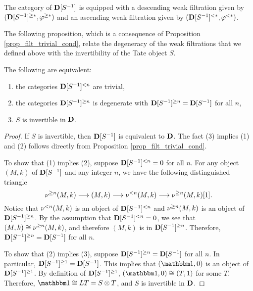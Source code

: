 \begin{thm}\label{thm_summary_dloc}
The category of $\DCatLoc{S}$ is equipped with a descending 
weak filtration given by $(\Prerad{*}{\DCatLoc{S}}, \prerad{*})$
and an ascending weak filtration given by $(\Corad{*}{\DCatLoc{S}},
\corad{*})$.
\end{thm}

The following proposition, which is a consequence of Proposition 
\ref{prop_filt_trivial_cond}, relate the degeneracy of the weak 
filtrations that we defined above with the invertibility of the
Tate object $S$.

\begin{prop}
The following are equivalent:
\begin{enumerate}
\item the categories $\Corad{n}{\DCatLoc{S}}$ are trivial,

\item the categories $\Prerad{n}{\DCatLoc{S}}$ is degenerate with
$\Prerad{n}{\DCatLoc{S}} = \DCatLoc{S}$ for all $n$,

\item $S$ is invertible in $\DCat$.
\end{enumerate}
\end{prop}
\begin{proof}
If $S$ is invertible, then $\DCatLoc{S}$ is equivalent to $\DCat$.
The fact (3) implies (1) and (2) follows directly from Proposition 
\ref{prop_filt_trivial_cond}.

To show that (1) implies (2), suppose $\Corad{n}{\DCatLoc{S}} = 0$
for all $n$. For any object $(M, k)$ of $\DCatLoc{S}$ and any integer
$n$, we have the following distinguished triangle
\[
\preradD{n}(M, k) \to (M, k) \to \coradD{n}(M, k) \to \preradD{n}(M, k)[1].
\]
Notice that $\coradD{n}(M, k)$ is an object of $\Corad{n}{\DCatLoc{S}}$
and $\preradD{n}(M, k)$ is an object of $\Prerad{n}{\DCatLoc{S}}$. By
the assumption that $\Corad{n}{\DCatLoc{S}} = 0$, we see that
$(M, k) \cong \preradD{n}(M, k)$, and therefore $(M, k)$ is in
$\Prerad{n}{\DCatLoc{S}}$. Therefore, $\Prerad{n}{\DCatLoc{S}} = 
\DCatLoc{S}$ for all $n$.

To show that (2) implies (3), suppose $\Prerad{n}{\DCatLoc{S}} = 
\DCatLoc{S}$ for all $n$. In particular, $\Prerad{1}{\DCatLoc{S}}
= \DCatLoc{S}$. This implies that $(\Unit, 0)$ is an object of
$\Prerad{1}{\DCatLoc{S}}$. By definition of $\Prerad{1}{\DCatLoc{S}}$, 
$(\Unit, 0) \cong (T, 1)$ for some $T$. Therefore, $\Unit \cong
LT = S \tensor T$, and $S$ is invertible in $\DCat$.
\end{proof}

